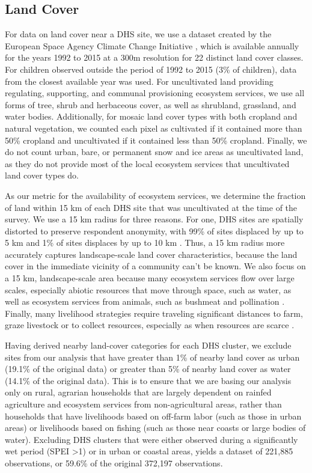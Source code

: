 \documentclass{article}
\begin{document}
\subsection{Land Cover}
For data on land cover near a DHS site, we use a dataset created by the European Space Agency Climate Change Initiative \cite{Defourny2017}, which is available annually for the years 1992 to 2015 at a 300m resolution for 22 distinct land cover classes.  For children observed outside the period of 1992 to 2015 (3\% of children), data from the closest available year was used. For uncultivated land providing regulating, supporting, and communal provisioning ecosystem services, we use all forms of tree, shrub and herbaceous cover, as well as shrubland, grassland, and water bodies.  Additionally, for mosaic land cover types with both cropland and natural vegetation, we counted each pixel as cultivated if it contained more than 50\% cropland and uncultivated if it contained less than 50\% cropland.  Finally, we do not count urban, bare, or permanent snow and ice areas as uncultivated land, as they do not provide most of the local ecosystem services that uncultivated land cover types do.

As our metric for the availability of ecosystem services, we determine the fraction of land within 15 km of each DHS site that was uncultivated at the time of the survey.  We use a 15 km radius for three reasons.  For one, DHS sites are spatially distorted to preserve respondent anonymity, with 99\% of sites displaced by up to 5 km and 1\% of sites displaces by up to 10 km \cite{Grace2012}.  Thus, a 15 km radius more accurately captures landscape-scale land cover characteristics, because the land cover in the immediate vicinity of a community can't be known.  We also focus on a 15 km, landscape-scale area because many ecosystem services flow over large scales, especially abiotic resources that move through space, such as water, as well as ecosystem services from animals, such as bushmeat and pollination \cite{Lopez-Hoffman2010}.  Finally, many livelihood strategies require traveling significant distances to farm, graze livestock or to collect resources, especially as when resources are scarce \cite{Felardo2016, Arku2010}.

Having derived nearby land-cover categories for each DHS cluster, we exclude sites from our analysis that have greater than 1\% of nearby land cover as urban (19.1\% of the original data) or greater than 5\% of nearby land cover as water (14.1\% of the original data).  This is to ensure that we are basing our analysis only on rural, agrarian households that are largely dependent on rainfed agriculture and ecosystem services from non-agricultural areas, rather than households that have livelihoods based on off-farm labor (such as those in urban areas) or livelihoods based on fishing (such as those near coasts or large bodies of water).  Excluding DHS clusters that were either observed during a significantly wet period (SPEI \textgreater 1) or in urban or coastal areas, yields a dataset of 221,885 observations, or 59.6\% of the original 372,197 observations.
\end{document}
